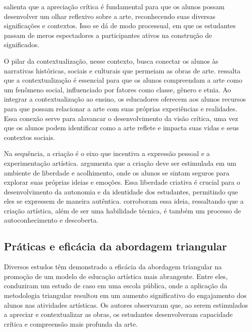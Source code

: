 \documentclass[portuguese]{textolivre}
\begin{document}
\textcite{barbosa2010arte} salienta que a apreciação crítica é fundamental para que os alunos possam desenvolver um olhar reflexivo sobre a arte, reconhecendo suas diversas significações e contextos. Isso se dá de modo processual, em que os estudantes passam de meros espectadores a participantes ativos na construção de significados.

O pilar da contextualização, nesse contexto, busca conectar os alunos às narrativas históricas, sociais e culturais que permeiam as obras de arte. \textcite{hernandez2000educacao} ressalta que a contextualização é essencial para que os alunos compreendam a arte como um fenômeno social, influenciado por fatores como classe, gênero e etnia. Ao integrar a contextualização ao ensino, os educadores oferecem aos alunos recursos para que possam relacionar a arte com suas próprias experiências e realidades. Essa conexão serve para alavancar o desenvolvimento da visão crítica, uma vez que os alunos podem identificar como a arte reflete e impacta suas vidas e seus contextos sociais.

Na sequência, a criação é o eixo que incentiva a expressão pessoal e a experimentação artística. \textcite{barbosa2010arte} argumenta que a criação deve ser estimulada em um ambiente de liberdade e acolhimento, onde os alunos se sintam seguros para explorar suas próprias ideias e emoções. Essa liberdade criativa é crucial para o desenvolvimento da autonomia e da identidade dos estudantes, permitindo que eles se expressem de maneira autêntica. \textcite{lopes2013metodologias} corroboram essa ideia, ressaltando que a criação artística, além de ser uma habilidade técnica, é também um processo de autoconhecimento e descoberta.

\subsection{Práticas e eficácia da abordagem triangular}

Diversos estudos têm demonstrado a eficácia da abordagem triangular na promoção de um modelo de educação artística mais abrangente. Entre eles, \textcite{lopes2013metodologias} conduziram um estudo de caso em uma escola pública, onde a aplicação da metodologia triangular resultou em um aumento significativo do engajamento dos alunos nas atividades artísticas. Os autores observaram que, ao serem estimulados a apreciar e contextualizar as obras, os estudantes desenvolveram capacidade crítica e compreensão mais profunda da arte.
\end{document}
